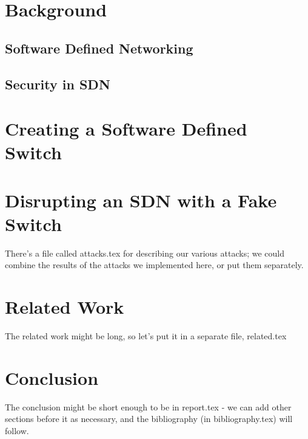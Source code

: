 \documentclass[12pt, letterpaper, twoside]{article}
\begin{document}
\begin{spacing}{1.0}
\begin{multicols}{2}
\section{Background}

\subsection{Software Defined Networking}

\subsection{Security in SDN}

\section{Creating a Software Defined Switch}
\label{fake}


\section{Disrupting an SDN with a Fake Switch}
\label{attacks}
There's a file called attacks.tex for describing our various attacks; we could combine the results of the attacks we implemented here, or put them separately.


\section{Related Work}
\label{related}
The related work might be long, so let's put it in a separate file, related.tex


\section{Conclusion}
The conclusion might be short enough to be in report.tex - we can add other sections before it as necessary, and the bibliography (in bibliography.tex) will follow.




\end{multicols}

\end{spacing}
\end{document}
